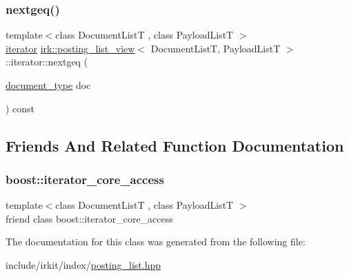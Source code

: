 \subsubsection{\texorpdfstring{nextgeq()}{nextgeq()}}
{\footnotesize\ttfamily template$<$class Document\+ListT , class Payload\+ListT $>$ \\
\mbox{\hyperlink{classirk_1_1posting__list__view_1_1iterator}{iterator}} \mbox{\hyperlink{classirk_1_1posting__list__view}{irk\+::posting\+\_\+list\+\_\+view}}$<$ Document\+ListT, Payload\+ListT $>$\+::iterator\+::nextgeq (\begin{DoxyParamCaption}\item[{\mbox{\hyperlink{classirk_1_1posting__list__view_ac4615e6e3d8ee1eb9a847b7a34919977}{document\+\_\+type}}}]{doc }\end{DoxyParamCaption}) const\hspace{0.3cm}{\ttfamily [inline]}}



\subsection{Friends And Related Function Documentation}
\mbox{\label{classirk_1_1posting__list__view_1_1iterator_ac09f73e325921cc50ebcd96bed0f8096}} 
\subsubsection{\texorpdfstring{boost\+::iterator\+\_\+core\+\_\+access}{boost::iterator\_core\_access}}
{\footnotesize\ttfamily template$<$class Document\+ListT , class Payload\+ListT $>$ \\
friend class boost\+::iterator\+\_\+core\+\_\+access\hspace{0.3cm}{\ttfamily [friend]}}



The documentation for this class was generated from the following file\+:\begin{DoxyCompactItemize}
\item 
include/irkit/index/\mbox{\hyperlink{posting__list_8hpp}{posting\+\_\+list.\+hpp}}\end{DoxyCompactItemize}
